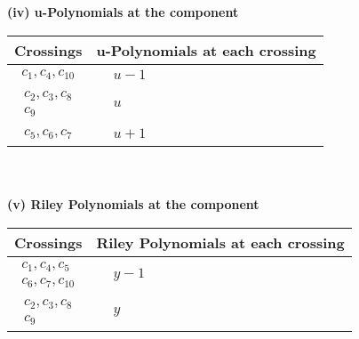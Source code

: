 \documentclass[1p]{elsarticle_modified}
\theoremstyle{definition}
\begin{document}
\flushleft \textbf{(iv) u-Polynomials at the component}\newline \\
\begin{tabular}{m{50pt}|m{274pt}}
Crossings & \hspace{64pt}u-Polynomials at each crossing \\
\hline $$\begin{aligned}c_{1},c_{4},c_{10}\end{aligned}$$&$\begin{aligned}
&u-1
\end{aligned}$\\
\hline $$\begin{aligned}c_{2},c_{3},c_{8}\\c_{9}\end{aligned}$$&$\begin{aligned}
&u
\end{aligned}$\\
\hline $$\begin{aligned}c_{5},c_{6},c_{7}\end{aligned}$$&$\begin{aligned}
&u+1
\end{aligned}$\\
\hline
\end{tabular}\\~\\
\newpage\renewcommand{\arraystretch}{1}
\flushleft \textbf{(v) Riley Polynomials at the component}\newline \\
\begin{tabular}{m{50pt}|m{274pt}}
Crossings & \hspace{64pt}Riley Polynomials at each crossing \\
\hline $$\begin{aligned}c_{1},c_{4},c_{5}\\c_{6},c_{7},c_{10}\end{aligned}$$&$\begin{aligned}
&y-1
\end{aligned}$\\
\hline $$\begin{aligned}c_{2},c_{3},c_{8}\\c_{9}\end{aligned}$$&$\begin{aligned}
&y
\end{aligned}$\\
\hline
\end{tabular}\\~\\
\end{document}
